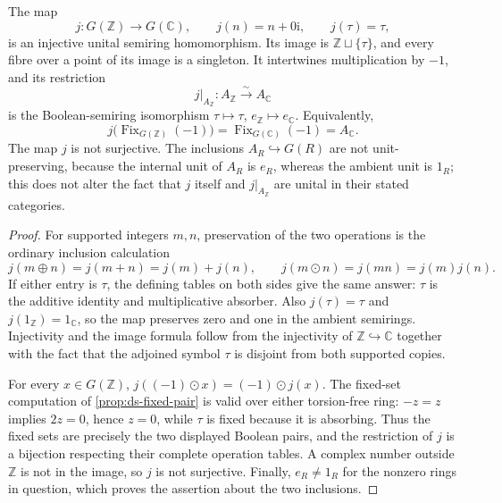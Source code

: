 \begin{proposition}
\label{prop:spc-integral-complex-embedding}
The map
\begin{equation}
\label{eq:spc-semiring-embedding}
 j:G(\mathbb Z)\longrightarrow G(\mathbb C),
 \qquad
 j(n)=n+0\mathrm i,\qquad j(\tau)=\tau,
\end{equation}
is an injective unital semiring homomorphism.  Its image is
\(\mathbb Z\sqcup\{\tau\}\), and every fibre over a point of its image is a
singleton.  It intertwines multiplication by \(-1\), and its restriction
\[
 j|_{A_{\mathbb Z}}:A_{\mathbb Z}\overset{\sim}{\longrightarrow}A_{\mathbb C}
\]
is the Boolean-semiring isomorphism \(\tau\mapsto\tau\),
\(e_{\mathbb Z}\mapsto e_{\mathbb C}\).  Equivalently,
\[
 j\bigl(\operatorname{Fix}_{G(\mathbb Z)}(-1)\bigr)
 =
 \operatorname{Fix}_{G(\mathbb C)}(-1)=A_{\mathbb C}.
\]
The map \(j\) is not surjective.  The inclusions
\(A_R\hookrightarrow G(R)\) are not unit-preserving, because the internal
unit of \(A_R\) is \(e_R\), whereas the ambient unit is \(1_R\); this does
not alter the fact that \(j\) itself and \(j|_{A_{\mathbb Z}}\) are unital in
their stated categories.
\end{proposition}

\begin{proof}
For supported integers \(m,n\), preservation of the two operations is the
ordinary inclusion calculation
\[
 j(m\oplus n)=j(m+n)=j(m)+j(n),
 \qquad
 j(m\odot n)=j(mn)=j(m)j(n).
\]
If either entry is \(\tau\), the defining tables on both sides give the same
answer: \(\tau\) is the additive identity and multiplicative absorber.  Also
\(j(\tau)=\tau\) and \(j(1_{\mathbb Z})=1_{\mathbb C}\), so the map preserves
zero and one in the ambient semirings.  Injectivity and the image formula
follow from the injectivity of \(\mathbb Z\hookrightarrow\mathbb C\) together
with the fact that the adjoined symbol \(\tau\) is disjoint from both supported
copies.

For every \(x\in G(\mathbb Z)\),
\(j((-1)\odot x)=(-1)\odot j(x)\).  The fixed-set computation of
\cref{prop:ds-fixed-pair} is valid over either torsion-free ring:
\(-z=z\) implies \(2z=0\), hence \(z=0\), while \(\tau\) is fixed because it
is absorbing.  Thus the fixed sets are precisely the two displayed Boolean
pairs, and the restriction of \(j\) is a bijection respecting their complete
operation tables.  A complex number outside \(\mathbb Z\) is not in the image,
so \(j\) is not surjective.  Finally, \(e_R\ne1_R\) for the nonzero rings in
question, which proves the assertion about the two inclusions.
\end{proof}

